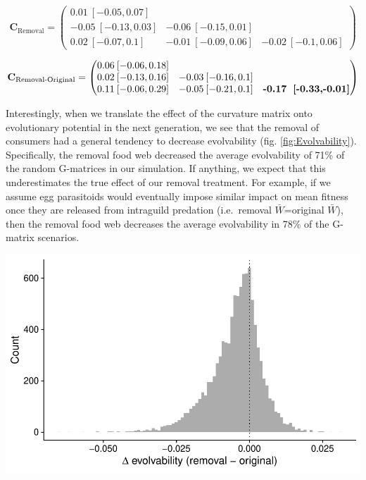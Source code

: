 \documentclass[11pt,]{article}
\let\origfigure\figure
\let\endorigfigure\endfigure
\renewenvironment{figure}[1][2] {
    \expandafter\origfigure\expandafter[H]
} {
    \endorigfigure
}
\begin{document}
\[\textbf{C}_{\text{Removal}} = \begin{pmatrix} 
0.01\: [-0.05,0.07] &  &  \\  
-0.05\: [-0.13,0.03] & -0.06\: [-0.15,0.01] &  \\  
0.02\: [-0.07,0.1] & -0.01\: [-0.09,0.06] & -0.02\: [-0.1,0.06] \end{pmatrix}\]

\[\textbf{C}_{\text{Removal-Original}} = \begin{pmatrix} 
0.06\: [-0.06,0.18] &  &  \\  
0.02\: [-0.13,0.16] & -0.03\: [-0.16,0.1] &  \\  
0.11\: [-0.06,0.29] & -0.05\: [-0.21,0.1] & \textbf{-0.17\: [-0.33,-0.01]} \end{pmatrix}\]

Interestingly, when we translate the effect of the curvature matrix onto
evolutionary potential in the next generation, we see that the removal
of consumers had a general tendency to decrease evolvability (fig.
\ref{fig:Evolvability}). Specifically, the removal food web decreased
the average evolvability of 71\% of the random G-matrices in our
simulation. If anything, we expect that this underestimates the true
effect of our removal treatment. For example, if we assume egg
parasitoids would eventually impose similar impact on mean fitness once
they are released from intraguild predation (i.e.~removal
\(\bar W\)=original \(\bar W\)), then the removal food web decreases the
average evolvability in 78\% of the G-matrix scenarios.

\bigskip

\begin{figure}
\centering
\includegraphics{../analyses/delta_evolvability.pdf}
\caption{\label{fig:Evolvability}Change in average evolvability for
10,000 random G-matrices using our best (mean) estimate of the curvature
matrix for each food-web treatment. We found that the curvature of the
removal food web decreased evolvability in 71\% of the G-matrices
(i.e.~the change in evolvability was negative for 71\% of the
simulations), suggesting that the removal of consumers tended to
decrease evolutionary potential of traits in our study.}
\end{figure}
\end{document}

